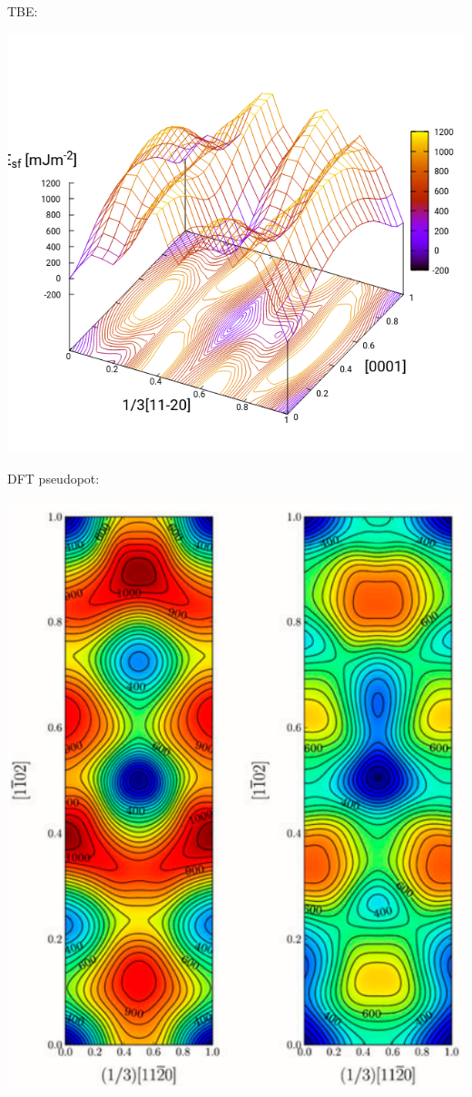 \documentclass[11pt]{article}
\begin{document}
\begin{enumerate}
\begin{enumerate}
TBE:
\begin{center}
\includegraphics[width=.9\linewidth]{Images/pyramidal_gs_noo_2019-11-08_alat.png}
\end{center}

DFT pseudopot:
\begin{center}
\includegraphics[width=.9\linewidth]{Images/pyramidal_gamma_surface_ready_data_both.png}
\end{center}


\end{enumerate}
\end{enumerate}
\end{document}

